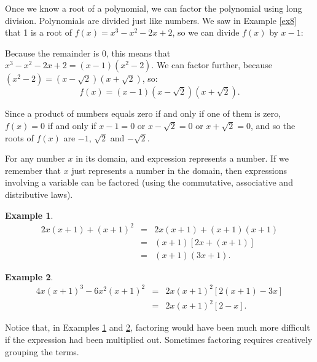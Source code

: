\documentclass[11pt]{book}               %
\newtheorem{example}{Example}
\begin{document}
Once we know a root of a polynomial, we can factor the polynomial using long division.
Polynomials are divided just like numbers.  We saw in Example \ref{ex8} that 1 is a root of $f(x)=x^3-x^2-2x+2$,
so we can divide $f(x)$ by $x-1$:
\begin{center}
\end{center}
%
Because the remainder is $0$, this means that $x^3-x^2-2x+2=(x-1)(x^2-2)$. We can factor further, because $(x^2-2) = (x-\sqrt{2})(x+\sqrt{2})$, so:
    $$
    f(x)=(x-1)\left(x-\sqrt{2}\right)\left(x+\sqrt{2}\right).
    $$

Since a product of numbers equals zero if and only if one of them is zero, 
$f(x)=0$ if and only if $x-1=0$ or $x-\sqrt{2}=0$ or $x+\sqrt{2}=0$, and so  
the roots of $f(x)$ are $-1$, $\sqrt{2}$ and $-\sqrt{2}$.

For any number $x$ in its domain, and expression represents a number.
If we remember that $x$ just represents a number in the domain, then
expressions involving a variable can be factored (using the commutative, associative and distributive laws). 

\begin{example}
$$
    \begin{array}{rcl}
    2x(x+1)+(x+1)^2 &=& 2x(x+1)+(x+1)(x+1) \\
                    &=& (x+1)[2x+(x+1)] \\
                    &=& (x+1)(3x+1).
    \end{array}
    $$
\label{ex9}
\end{example}
    
\begin{example}
    $$
    \begin{array}{rcl}
    4x(x+1)^3-6x^2(x+1)^2   &=& 2x(x+1)^2[2(x+1)-3x]\\
                        &=& 2x(x+1)^2[2-x].
    \end{array}
    $$
\label{ex10}
\end{example}

Notice that, in Examples \ref{ex9} and \ref{ex10}, factoring would have been much more difficult if the expression had been multiplied out. Sometimes factoring requires creatively grouping the terms. 
\end{document}
